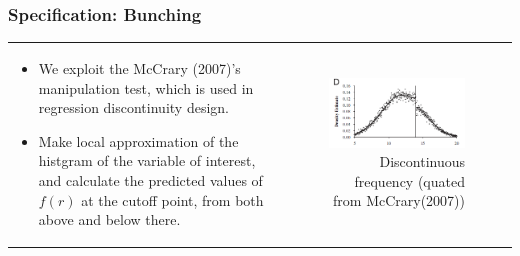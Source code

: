 \documentclass[dvipdfmx,12pt]{beamer}
\begin{document}
\begin{frame}\frametitle{Specification: Bunching}

  \begin{tabular}{lr}
    \begin{minipage}[H]{0.45\textwidth}
      \small
      \begin{itemize}
        \item We exploit the McCrary (2007)'s manipulation test, which is used in regression discontinuity design.

        \item Make local approximation of the histgram of the variable of interest, and calculate the predicted values of $f(r)$ at the cutoff point, from both above and below there.
      \end{itemize}
    \end{minipage}
    &
    \begin{minipage}[H]{0.5\textwidth}
      \begin{figure}
        \includegraphics[keepaspectratio, scale = 0.8]{graphs/McCrary_figD.png}
        \caption{Discontinuous frequency (quated from McCrary(2007))}
        \label{McC}
      \end{figure}
    \end{minipage}
  \end{tabular}

\end{frame}
\end{document}
